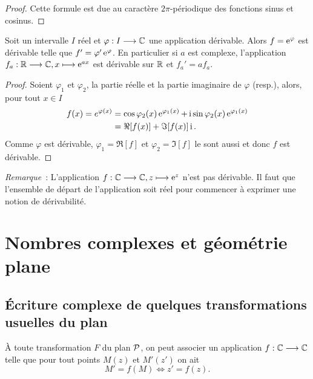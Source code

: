 \begin{proof}
  Cette formule est due au caractère \(2\pi\)-périodique des fonctions sinus 
  et cosinus.
\end{proof}

\begin{prop}
  Soit un intervalle \(I\) réel et \(\fonctionR{\varphi}{I}{\C}\) une application 
  dérivable. Alors \(f = \e^\varphi\) est dérivable telle que \(f' = \varphi' 
  \e^\varphi\). En particulier si \(a\) est complexe, l'application 
  \(\fonctionL{f_a}{\R}{\C}{x}{\e^{ax}}\) est dérivable sur \(\R\) et \(f_a' = 
  af_a\).
\end{prop}

\begin{proof}
  Soient \(\varphi_1\) et \(\varphi_2\), la partie réelle et la partie 
  imaginaire de \(\varphi\) (resp.), alors, pour tout \(x \in I\)
  \begin{align*}
    f(x) = e^{\varphi(x)}& = \cos \varphi_2(x) \e^{\varphi_1(x)}+ \ii \sin 
    \varphi_2(x)\e^{\varphi_1(x)}\\ 
    & = \Re[f(x)] + \Im[f(x)]\ii.
  \end{align*}
  Comme \(\varphi\) est dérivable, \(\varphi_1 = \Re[f]\) et \(\varphi_2 = 
  \Im[f]\) le sont aussi et donc \(f\) est dérivable.
\end{proof}

\emph{Remarque}~: L'application \(\fonctionL{f}{\C}{\C}{z}{\e^z}\) n'est pas 
dérivable. Il faut que l'ensemble de départ de l'application soit réel pour 
commencer à exprimer une notion de dérivabilité.

\section{Nombres complexes et géométrie plane}
\label{sec:complexesetgeometrie}

\subsection{Écriture complexe de quelques transformations usuelles du plan}
\label{subsec:ecriturecomplexeettransformations}

À toute transformation \(F\) du plan \(\P\), on peut associer un application 
\(\fonctionR{f}{\C}{\C}\) telle que pour tout points \(M(z)\) et \(M'(z')\) on 
ait
\begin{equation}
  M' = f(M) \iff z' = f(z).
\end{equation}

